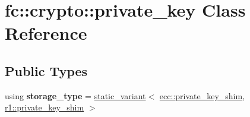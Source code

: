 \hypertarget{classfc_1_1crypto_1_1private__key}{}\section{fc\+:\+:crypto\+:\+:private\+\_\+key Class Reference}
\label{classfc_1_1crypto_1_1private__key}
\subsection*{Public Types}
\begin{DoxyCompactItemize}
\item 
\mbox{\label{classfc_1_1crypto_1_1private__key_a22e0ea218e9e53ed63696f5c0214beb0}} 
using {\bfseries storage\+\_\+type} = \mbox{\hyperlink{classfc_1_1static__variant}{static\+\_\+variant}}$<$ \mbox{\hyperlink{structfc_1_1ecc_1_1private__key__shim}{ecc\+::private\+\_\+key\+\_\+shim}}, \mbox{\hyperlink{structfc_1_1crypto_1_1r1_1_1private__key__shim}{r1\+::private\+\_\+key\+\_\+shim}} $>$
\end{DoxyCompactItemize}
